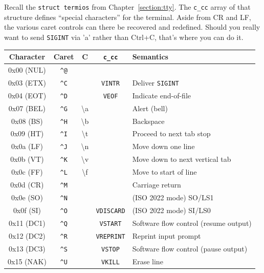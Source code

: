 Recall the \texttt{struct termios} from Chapter~\ref{section:tty}. The \texttt{c\_cc}
array of that structure defines ``special characters'' for the terminal. Aside from
CR and LF, the various caret controls can there be recovered and redefined. Should
you really want to send \texttt{SIGINT} via 'a' rather than Ctrl+C, that's where
you can do it.

\begin{table}[!htb]
  \centering
  \begin{tabular}{ |c|c|c|c|l| }
    \hline
    Character & Caret & C & \texttt{c\_cc} & Semantics \\
    \hline
    \hline
    0x00 (NUL) & \texttt{\^{}@} & & & \\
    \hline
    0x03 (ETX) & \texttt{\^{}C} & & \texttt{VINTR} & Deliver \texttt{SIGINT} \\
    \hline
    0x04 (EOT) & \texttt{\^{}D} & & \texttt{VEOF} & Indicate end-of-file \\
    \hline
    0x07 (BEL) & \texttt{\^{}G} & \textbackslash{}a & & Alert (bell) \\
    \hline
    0x08 (BS) & \texttt{\^{}H} & \textbackslash{}b & & Backspace \\
    \hline
    0x09 (HT) & \texttt{\^{}I} & \textbackslash{}t & & Proceed to next tab stop \\
    \hline
    0x0a (LF) & \texttt{\^{}J} & \textbackslash{}n & & Move down one line \\
    \hline
    0x0b (VT) & \texttt{\^{}K} & \textbackslash{}v & & Move down to next vertical tab \\
    \hline
    0x0c (FF) & \texttt{\^{}L} & \textbackslash{}f & & Move to start of line \\
    \hline
    0x0d (CR) & \texttt{\^{}M} & & & Carriage return \\
    \hline
    0x0e (SO) & \texttt{\^{}N} & & & (ISO 2022 mode) SO/LS1 \\
    \hline
    0x0f (SI) & \texttt{\^{}O} & & \texttt{VDISCARD} & (ISO 2022 mode) SI/LS0 \\
    \hline
    0x11 (DC1) & \texttt{\^{}Q} & & \texttt{VSTART} & Software flow control (resume output) \\
    \hline
    0x12 (DC2) & \texttt{\^{}R} & & \texttt{VREPRINT} & Reprint input prompt \\
    \hline
    0x13 (DC3) & \texttt{\^{}S} & & \texttt{VSTOP} & Software flow control (pause output) \\
    \hline
    0x15 (NAK) & \texttt{\^{}U} & & \texttt{VKILL} & Erase line \\

\end{tabular}
\end{table}
